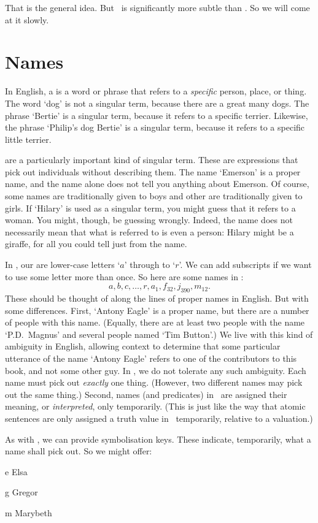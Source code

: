 That is the general idea. But \FOL\ is significantly more subtle than \TFL. So we will come at it slowly. 


\section{Names}
In English, a  is a word or phrase that refers to a \emph{specific} person, place, or thing. The word `dog' is not a singular term, because there are a great many dogs. The phrase `Bertie' is a singular term, because it refers to a specific terrier. Likewise, the phrase `Philip's dog Bertie' is a singular term, because it refers to a specific little terrier. 

 are a particularly important kind of singular term. These are expressions that pick out individuals without describing them. The name `Emerson' is a proper name, and the name alone does not tell you anything about Emerson. Of course, some names are traditionally given to boys and other are traditionally given to girls. If `Hilary' is used as a singular term, you might guess that it refers to a woman. You might, though, be guessing wrongly. Indeed, the name does not necessarily mean that what is referred to is even a person: Hilary might be a giraffe, for all you could tell just from the name. 

In \FOL, our  are lower-case letters `$a$' through to `$r$'. We can add subscripts if we want to use some letter more than once. So here are some names in \FOL:
	\[a,b,c,…, r, a_{1}, f_{32}, j_{390}, m_{12}.\]
These should be thought of along the lines of proper names in English. But with some differences. First, `Antony Eagle' is a proper name, but there are a number of people with this name. (Equally, there are at least two people with the name `P.D.\ Magnus' and several people named `Tim Button'.) We live with this kind of ambiguity in English, allowing context to determine that some particular utterance of the name `Antony Eagle' refers to one of the contributors to this book, and not some other guy. In \FOL, we do not tolerate any such ambiguity. Each name must pick out \emph{exactly} one thing. (However, two different names may pick out the same thing.)  Second, names (and predicates) in \FOL\ are assigned their meaning, or \emph{interpreted}, only temporarily. (This is just like the way that atomic sentences are only assigned a truth value in \TFL\ temporarily, relative to a valuation.)

As with \TFL, we can provide symbolisation keys. These indicate, temporarily, what a name shall pick out. So we might offer:
	\begin{ekey}
		\item[e] Elsa
		\item[g] Gregor
		\item[m] Marybeth
	\end{ekey}

